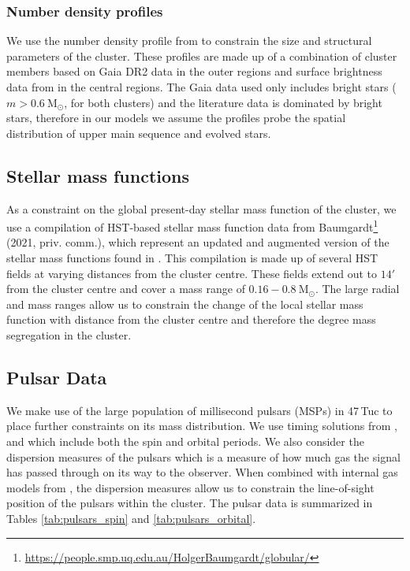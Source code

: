 \subsubsection{Number density profiles}
We use the number density profile from \citet{DeBoer2019} to constrain the size and structural
parameters of the cluster. These profiles are made up of a combination of cluster members based on
Gaia DR2 data in the outer regions and surface brightness data from \citet{Trager1995} in the
central regions. The Gaia data used only includes bright stars ($m > 0.6 \ \mathrm{M}_\odot$, for
both clusters) and the literature data is dominated by bright stars, therefore in our models we
assume the profiles probe the spatial distribution of upper main sequence and evolved stars.

\subsection{Stellar mass functions}

As a constraint on the global present-day stellar mass function of the cluster, we use a compilation
of HST-based stellar mass function data from
Baumgardt\footnote{\url{https://people.smp.uq.edu.au/HolgerBaumgardt/globular/}} (2021, priv.
comm.), which represent an updated and augmented version of the stellar mass functions found in
\citet{Sollima2017}. This compilation is made up of several HST fields at varying distances from the
cluster centre. These fields extend out to $14 '$ from the cluster centre and cover a mass range of
$0.16 - 0.8 \ \mathrm{M}_\odot$. The large radial and mass ranges allow us to constrain the change
of the local stellar mass function with distance from the cluster centre and therefore the degree
mass segregation in the cluster.

\subsection{Pulsar Data}

We make use of the large population of millisecond pulsars (MSPs) in 47\,Tuc to place further
constraints on its mass distribution. We use timing solutions from \citet{Freire2017},
\citet{Ridolfi2016} and \citet{Freire2018} which include both the spin and orbital periods. We also
consider the dispersion measures of the pulsars which is a measure of how much gas the signal has
passed through on its way to the observer. When combined with internal gas models from
\citet{Abbate2018}, the dispersion measures allow us to constrain the line-of-sight position of the
pulsars within the cluster. The pulsar data is summarized in Tables \ref{tab:pulsars_spin} and
\ref{tab:pulsars_orbital}.

